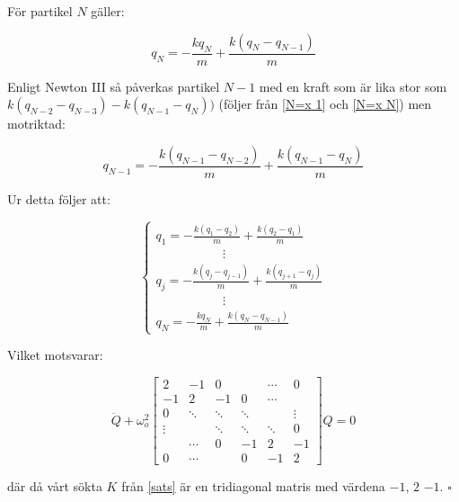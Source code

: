 \documentclass[12pt,a4paper]{article}
\begin{document}
\begin{appendix}
		För partikel $N$ gäller:
		
		\begin{equation}
			q_N = -\frac{k q_N}{m} + \frac{k (q_N - q_{N-1})}{m}
			\label{N=x N}
		\end{equation}
		
		Enligt Newton III så påverkas partikel $N - 1$ med en kraft som är lika stor
		som $k(q_{N-2} - q_{N-3}) - k (q_{N-1} - q_N))$ (följer från \ref{N=x 1} och \ref{N=x N})
		men motriktad:
		
		\begin{equation}
			q_{N-1} = -\frac{k(q_{N-1}-q_{N-2})}{m} + \frac{k(q_{N-1}-q_N)}{m}
		\end{equation}
		
		Ur detta följer att:
		
		\begin{equation*}
			\begin{cases}
				q_1 = -\frac{k (q_1 - q_2)}{m} + \frac{k(q_2 - q_1)}{m} \\
				\hspace{64pt} \vdots \\
				q_j = -\frac{k (q_j - q_{j-1})}{m} + \frac{k(q_{j+1}-q_j)}{m} \\
				\hspace{64pt} \vdots \\
				q_N = -\frac{k q_N}{m} + \frac{k (q_N - q_{N-1})}{m}
			\end{cases}
		\end{equation*}
		
		Vilket motsvarar:
		
		\begin{equation*}
			\ddot{Q} + \omega_o^2 \begin{bmatrix}
				2 & -1 & 0 & & \cdots & 0 \\
				-1 & 2 & -1 & 0 & \cdots & \\
				0 & \ddots & \ddots & \ddots & & \vdots \\
				\vdots &  & \ddots & \ddots & \ddots & 0 \\
				& \cdots & 0 & -1 & 2  & -1 \\
				0 & \cdots & & 0 & -1 & 2
			\end{bmatrix} Q = 0
		\end{equation*}
		
		där då vårt sökta $K$ från \ref{sats} är en tridiagonal matris med värdena $-1$, $2$ $-1$. \hfill $\square$
		
	\end{appendix}
\end{document}
